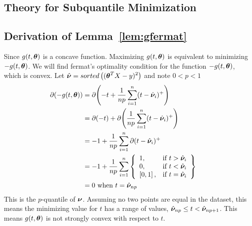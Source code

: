 \documentclass{article} %
\begin{document}
\begin{appendices}
	
	\newpage
	\section{Theory for Subquantile Minimization}\label{app:general-proofs}
	\subsection{Derivation of Lemma~\ref{lem:gfermat}}
	\label{app:gfermat}
	Since $\displaystyle g(t,{\bm{\theta}})$ is a concave function. Maximizing $g(t,{\bm{\theta}})$ is equivalent to minimizing $-g(t,{\bm{\theta}})$. We will find fermat's optimality condition for the function $\displaystyle -g(t,{\bm{\theta}})$, which is convex. 
	Let $\displaystyle \hat{{\bm{\nu}}} = sorted\left(({\bm{\theta}}^T X - y)^2\right)$ and note $\displaystyle 0 < p < 1$
	\begin{align}
		\partial{\displaystyle (-g(t,\boldsymbol{\theta}})) &= \partial{\left(-t + \frac{1}{np}\sum_{i=1}^{n}(t-\hat{{\bm{\nu}}}_i)^+\right)} &&\\
		&= \partial{(-t)} + \partial{\left(\frac{1}{np}\sum_{i=1}^{n}(t-\hat{{\bm{\nu}}}_i)^+\right)}&&\\
		&= -1 + \frac{1}{np}\sum_{i=1}^{n}\partial{(t-\hat{{\bm{\nu}}}_i)^+} &&\\
		&= -1 + \frac{1}{np}\sum_{i=1}^{n}
		\left\{
		\begin{array}{lr}
			1, & \text{if } t > \hat{{\bm{\nu}}}_i\\
			0, & \text{if } t < \hat{{\bm{\nu}}}_i \\
			\left[0,1\right], & \text{if } t = \hat{{\bm{\nu}}}_i \\
		\end{array}
		\right\}&&\\
		&= 0 \text{ when }\displaystyle t = \hat{{\bm{\nu}}}_{np}&&
	\end{align}
	This is the $p$-quantile of $\displaystyle {\bm{\nu}}$. Assuming no two points are equal in the dataset, this means the minimizing value for $t$ has a range of values, $\hat{{\bm{\nu}}}_{np} \leq t < \hat{{\bm{\nu}}}_{np+1}$. This means $g(t,{\bm{\theta}})$ is not strongly convex with respect to $t$. 

\end{appendices}
\end{document}

